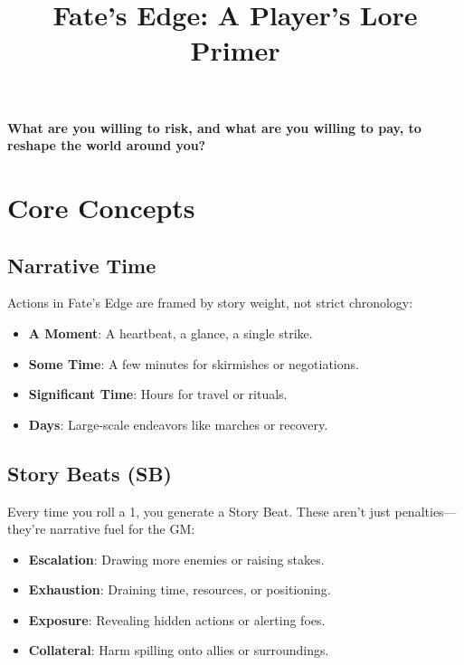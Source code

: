 \documentclass[11pt,twoside]{article}
\title{Fate's Edge: A Player's Lore Primer}
\author{}
\date{}
\begin{document}
\maketitle
\thispagestyle{fancy}

\begin{center}
\textbf{What are you willing to risk, and what are you willing to pay, to reshape the world around you?}
\end{center}

\vspace{1em}

\tableofcontents

\newpage

\section{Core Concepts}

\subsection{Narrative Time}
Actions in Fate's Edge are framed by story weight, not strict chronology:
\begin{itemize}[leftmargin=*]
    \item \textbf{A Moment}: A heartbeat, a glance, a single strike.
    \item \textbf{Some Time}: A few minutes for skirmishes or negotiations.
    \item \textbf{Significant Time}: Hours for travel or rituals.
    \item \textbf{Days}: Large-scale endeavors like marches or recovery.
\end{itemize}

\subsection{Story Beats (SB)}
Every time you roll a 1, you generate a Story Beat. These aren't just penalties—they're narrative fuel for the GM:
\begin{itemize}[leftmargin=*]
    \item \textbf{Escalation}: Drawing more enemies or raising stakes.
    \item \textbf{Exhaustion}: Draining time, resources, or positioning.
    \item \textbf{Exposure}: Revealing hidden actions or alerting foes.
    \item \textbf{Collateral}: Harm spilling onto allies or surroundings.
\end{itemize}
\end{document}
